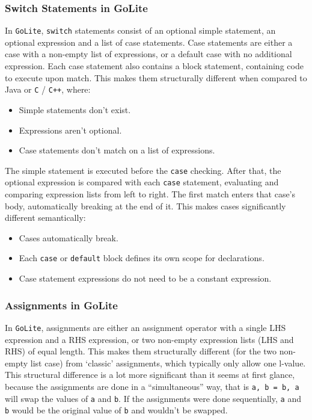 \documentclass[11pt]{article}
\begin{document}
\subsubsection{Switch Statements in GoLite}
In \texttt{GoLite}, \texttt{switch} statements consist of an optional
simple statement, an optional expression and a list of case
statements. Case statements are either a case with a non-empty list of
expressions, or a default case with no additional expression.  Each
case statement also contains a block statement, containing code to
execute upon match. This makes them structurally different when
compared to Java or \texttt{C} / \texttt{C++}, where:
\begin{itemize}[noitemsep]
\item Simple statements don't exist.
\item Expressions aren't optional.
\item Case statements don't match on a list of expressions.
\end{itemize}
The simple statement is executed before the \texttt{case} checking.
After that, the optional expression is compared with each
\texttt{case} statement, evaluating and comparing expression lists
from left to right. The first match enters that case's body,
automatically breaking at the end of it. This makes cases
significantly different semantically:
\begin{itemize}[noitemsep]
\item Cases automatically break.
\item Each \texttt{case} or \texttt{default} block defines its own
  scope for declarations.
\item Case statement expressions do not need to be a constant
  expression.
\end{itemize}
\subsubsection{Assignments in GoLite}
In \texttt{GoLite}, assignments are either an assignment operator with
a single LHS expression and a RHS expression, or two non-empty
expression lists (LHS and RHS) of equal length. This makes them
structurally different (for the two non-empty list case) from
`classic' assignments, which typically only allow one l-value.  This
structural difference is a lot more significant than it seems at first
glance, because the assignments are done in a ``simultaneous'' way,
that is \texttt{a, b = b, a} will swap the values of \texttt{a} and
\texttt{b}. If the assignments were done sequentially, \texttt{a} and
\texttt{b} would be the original value of \texttt{b} and wouldn't be
swapped.
\end{document}
